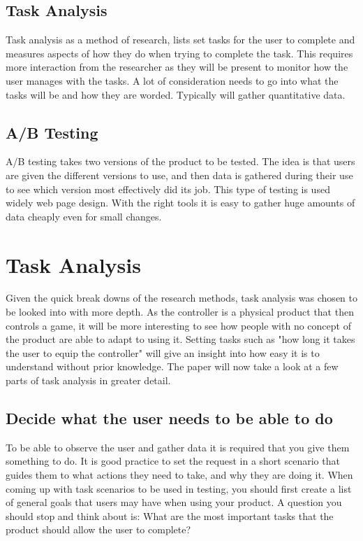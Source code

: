 \documentclass{scrartcl}
\begin{document}
	\subsection{Task Analysis}
		Task analysis as a method of research, lists set tasks for the user to complete and measures aspects of how they do when trying to complete the task. This requires more interaction from the researcher as they will be present to monitor how the user manages with the tasks\cite{diaper2003handbook}. A lot of consideration needs to go into what the tasks will be and how they are worded. Typically will gather quantitative data.
		
	\subsection{A/B Testing}
		A/B testing takes two versions of the product to be tested. The idea is that users are given the different versions to use, and then data is gathered during their use to see which version most effectively did its job. This type of testing is used widely web page design\cite{azevedo2018b}. With the right tools it is easy to gather huge amounts of data cheaply even for small changes. 
		
	\section{Task Analysis}
		Given the quick break downs of the research methods, task analysis was chosen to be looked into with more depth. As the controller is a physical product that then controls a game, it will be more interesting to see how people with no concept of the product are able to adapt to using it. Setting tasks such as "how long it takes the user to equip the controller" will give an insight into how easy it is to understand without prior knowledge. The paper will now take a look at a few parts of task analysis in greater detail.
		
	\subsection{Decide what the user needs to be able to do}
		To be able to observe the user and gather data it is required that you give them something to do. It is good practice to set the request in a short scenario that guides them to what actions they need to take, and why they are doing it. When coming up with task scenarios to be used in testing, you should first create a list of general goals that users may have when using your product. A question you should stop and think about is: What are the most important tasks that the product should allow the user to complete?\cite{nielsen_norman_tognazzini_2018}
	
\end{document}
